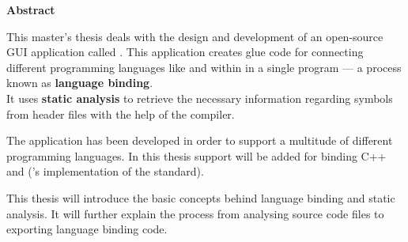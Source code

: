 \thispagestyle{empty}
\textbf{Abstract}

This master's thesis deals with the design and development of an open-source GUI application called . This application creates glue code for connecting different programming languages like  and  within in a single \linebreak program --- a process known as \textbf{language binding}.\\
It uses \textbf{static analysis} to retrieve the necessary information regarding symbols from  header files with the help of the   compiler.

The application has been developed in order to support a multitude of different \linebreak programming languages. In this thesis support will be added for binding C++ and  ('s implementation of the  standard).

This thesis will introduce the basic concepts behind language binding and static analysis. It will further explain the process from analysing source code files to exporting language binding code.